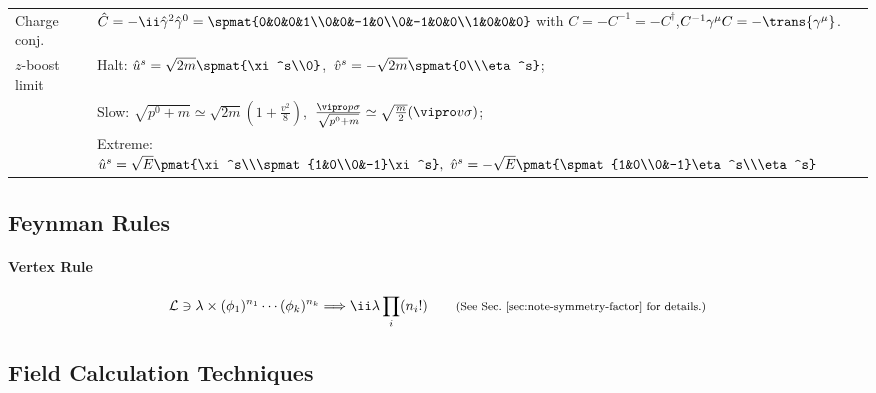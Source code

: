\begin{tabular}{l@{ :\ \ \ }l}
Charge conj. & $\hat C=-\ii\hat\gamma^2\hat\gamma^0
 = \spmat{0&0&0&1\\0&0&-1&0\\0&-1&0&0\\1&0&0&0}$\qquad
                 with $C=-C^{-1}=-C^\dagger$,\quad $C^{-1}\Gm C=-\trans{\Gm}$.\\
$z$-boost limit &
Halt: $\hat u^s=\sqrt{2m}\spmat{\xi^s\\0}$,\ $\hat v^s=-\sqrt{2m}\spmat{0\\\eta^s}$;\\
&Slow:
$\sqrt{p^0+m}\simeq\sqrt{2m}(1+\frac{v^2}8)$,\
$\frac{\vipro p\sigma}{\sqrt{p^0+m}}\simeq\sqrt{\frac m2}(\vipro v\sigma)$;\\
&Extreme: 
  $\hat u^s=\sqrt E\pmat{\xi^s\\\spmat{1&0\\0&-1}\xi^s},\
   \hat v^s=-\sqrt E\pmat{\spmat{1&0\\0&-1}\eta^s\\\eta^s}$\\
\end{tabular}




\subsection{Feynman Rules}
\paragraph{Vertex Rule}
\begin{equation*}
 \Lag\ni\lambda\times (\phi_1)^{n_1}\cdots(\phi_k)^{n_k} \Longrightarrow \ii\lambda \prod_i(n_i!)
\qquad\text{\footnotesize (See Sec.~\ref{sec:note-symmetry-factor} for details.)}
\end{equation*}

\newpage

\twocolumn

\onecolumn


\newpage
\subsection{Field Calculation Techniques}
